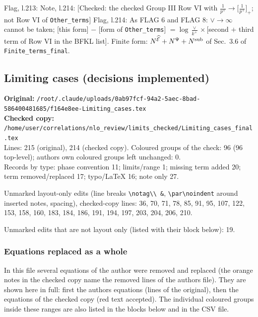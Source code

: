 \documentclass[10pt]{article}
\newenvironment{notebox}{\def\FrameCommand{{\color{notebar}\vrule width 1.5pt}\hspace{6pt}}\MakeFramed{\advance\hsize-\width\FrameRestore}\small}{\endMakeFramed}
\begin{document}
\begin{notebox}\textsf{\small Flag, l.213:} \end{notebox}
\begin{notebox}\textsf{\small Note, l.214:} [Checked: the checked Group III Row VI with $\frac{1}{p^{+}}\to\big[\frac{1}{p^{+}}\big]_{+}$; not Row VI of \texttt{Other\_terms}]\end{notebox}
\begin{notebox}\textsf{\small Flag, l.214:}  As FLAG 6 and FLAG 8: $\vee\to\infty$ cannot be taken; [this form] $-$ [form of \texttt{Other\_terms}] $=\log\frac{\vee}{k^{+}}\times$[second $+$ third term of Row VI in the BFKL list]. Finite form: $N^{\widehat{\mathcal{E}}}+N^{\Psi}+N^{\rm sub}$ of Sec.~3.6 of \texttt{Finite\_terms\_final}.\end{notebox}
\bigskip
\subsection{Limiting cases (decisions implemented)}\label{sec:file-limiting_final}
\noindent\textbf{Original:} \texttt{/root/.claude/uploads/0ab97fcf-94a2-5aec-8bad-586400481685/f164e8ee-Limiting\_cases.tex}\\\textbf{Checked copy:} \texttt{/home/user/correlations/nlo\_review/limits\_checked/Limiting\_cases\_final.tex}\\
Lines: 215 (original), 214 (checked copy). Coloured groups of the check: 96 (96 top-level); author\textquotesingle s own coloured groups left unchanged: 0.\\
Records by type: phase convention 11; limits/range 1; missing term added 20; term removed/replaced 17; typo/LaTeX 16; note only 27.
\par\noindent Unmarked layout-only edits (line breaks \texttt{\textbackslash notag\textbackslash\textbackslash\ \&}, \texttt{\textbackslash par\textbackslash noindent} around inserted notes, spacing), checked-copy lines: 36, 70, 71, 78, 85, 91, 95, 107, 122, 153, 158, 160, 183, 184, 186, 191, 194, 197, 203, 204, 206, 210.
\par\noindent Unmarked edits that are not layout only (listed with their block below): 19.
\subsubsection*{Equations replaced as a whole}
In this file several equations of the author were removed and replaced (the orange notes in the checked copy name the removed lines of the author\textquotesingle s file). They are shown here in full: first the author\textquotesingle s equations (lines of the original), then the equations of the checked copy (red text accepted). The individual coloured groups inside these ranges are also listed in the blocks below and in the CSV file.
\end{document}
